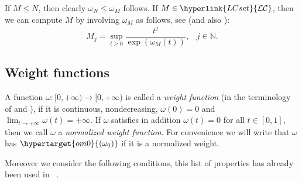 \documentclass[10pt]{amsart}%
\numberwithin{equation}{section}
\theoremstyle{plain}
\newcommand{\NN}{\mathbb{N}}
\begin{document}
If $M\le N$, then clearly $\omega_N\le\omega_M$ follows. If $M\in\hyperlink{LCset}{\mathcal{LC}}$, then we can compute $M$ by involving $\omega_M$ as follows, see \cite[Chapitre I, 1.4, 1.8]{mandelbrojtbook} (and also \cite[Prop. 3.2]{Komatsu73}):
\begin{equation}\label{Prop32Komatsu}
M_j=\sup_{t\ge 0}\frac{t^j}{\exp(\omega_{M}(t))},\;\;\;j\in\NN.
\end{equation}

\subsection{Weight functions}\label{weightfunctions}
A function $\omega:[0,+\infty)\rightarrow[0,+\infty)$ is called a {\itshape weight function} (in the terminology of \cite[Section 2.1]{index} and \cite[Section 2.2]{sectorialextensions}), if it is continuous, nondecreasing, $\omega(0)=0$ and $\lim_{t\rightarrow+\infty}\omega(t)=+\infty$. If $\omega$ satisfies in addition $\omega(t)=0$ for all $t\in[0,1]$, then we call $\omega$ a {\itshape normalized weight function}. For convenience we will write that $\omega$ has $\hypertarget{om0}{(\omega_0)}$ if it is a normalized weight.\vspace{6pt}


Moreover we consider the following conditions, this list of properties has already been used in ~\cite{dissertation}.
\end{document}
